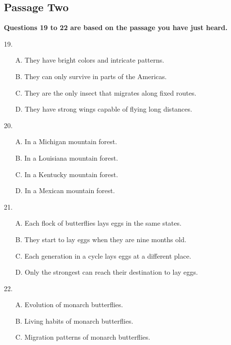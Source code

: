 \documentclass[UTF8,11pt]{ctexart}
\begin{document}
\subsection*{\textbf{Passage Two}}


\textbf{Questions 19 to 22 are based on the passage you have just heard.}


19.


\begin{itemize}[leftmargin=2em,itemsep=.2em,topsep=.4em]\item[A.] They have bright colors and intricate patterns.
\item[B.] They can only survive in parts of the Americas.
\item[C.] They are the only insect that migrates along fixed routes.
\item[D.] They have strong wings capable of flying long distances.
\end{itemize}

20.


\begin{itemize}[leftmargin=2em,itemsep=.2em,topsep=.4em]\item[A.] In a Michigan mountain forest.
\item[B.] In a Louisiana mountain forest.
\item[C.] In a Kentucky mountain forest.
\item[D.] In a Mexican mountain forest.
\end{itemize}

21.


\begin{itemize}[leftmargin=2em,itemsep=.2em,topsep=.4em]\item[A.] Each flock of butterflies lays eggs in the same states.
\item[B.] They start to lay eggs when they are nine months old.
\item[C.] Each generation in a cycle lays eggs at a different place.
\item[D.] Only the strongest can reach their destination to lay eggs.
\end{itemize}

22.


\begin{itemize}[leftmargin=2em,itemsep=.2em,topsep=.4em]\item[A.] Evolution of monarch butterflies.
\item[B.] Living habits of monarch butterflies.
\item[C.] Migration patterns of monarch butterflies.
\end{itemize}
\end{document}
